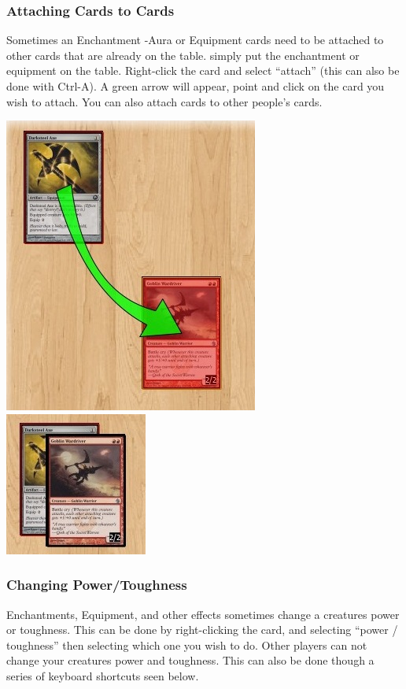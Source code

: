 \documentclass[a4paper]{scrbook}
\begin{document}
\subsubsection{Attaching Cards to Cards}
Sometimes an Enchantment -Aura or Equipment cards need to be attached to other cards that are already on the table. simply put the enchantment or equipment on the table. Right-click the card and select “attach” (this can also be done with Ctrl-A). A green arrow will appear, point and click on the card you wish to attach. You can also attach cards to other people's cards.
\begin{center}
 \includegraphics{pics/fetch100e}\\
 \includegraphics{pics/fetchb17a}
\end{center}


\subsubsection{Changing Power/Toughness}
Enchantments, Equipment, and other effects sometimes change a creatures power or toughness. This can be done by right-clicking the card, and selecting “power / toughness” then selecting which one you wish to do. Other players can not change your creatures power and toughness. This can also be done though a series of keyboard shortcuts seen below.
\end{document}
